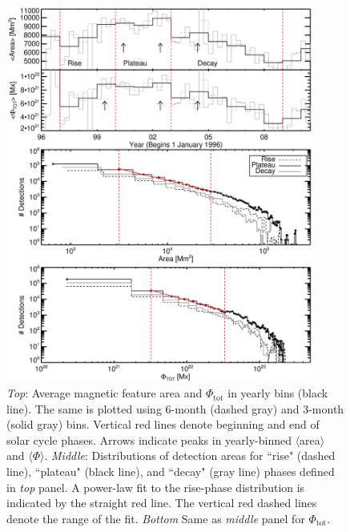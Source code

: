 \begin{figure}[!t]
\centerline{\includegraphics[width=0.9\textwidth,angle=0]{plot_2_phase_cycle_ar_prop.eps}}
\caption[The distribution of AR area and flux over the solar cycle.]{\emph{Top}: Average magnetic feature area and $\Phi_{\mathrm{tot}}$ in yearly bins (black line). The same is plotted using 6-month (dashed gray) and 3-month (solid gray) bins. Vertical red lines denote beginning and end of solar cycle phases. Arrows indicate peaks in yearly-binned $\langle$area$\rangle$ and $\langle\Phi\rangle$. \emph{Middle}: Distributions of detection areas for ``rise" (dashed line), ``plateau" (black line), and ``decay" (gray line) phases defined in \emph{top} panel. A power-law fit to the rise-phase distribution is indicated by the straight red line. The vertical red dashed lines denote the range of the fit. \emph{Bottom} Same as \emph{middle} panel for $\Phi_{\mathrm{tot}}$.}
\label{plot_2_phase_cycle_ar_prop}
\end{figure}

